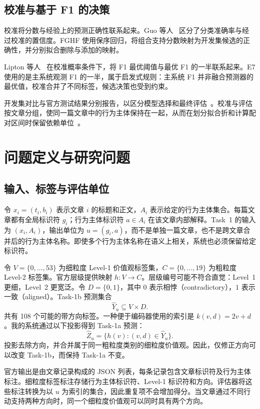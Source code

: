 \documentclass[12pt,a4paper]{article}
\begin{document}
\subsection{校准与基于 F1 的决策}
校准将分数与经验上的预测正确性联系起来。Guo 等人~\cite{guo2017} 区分了分类准确率与经过校准的置信度。FGHF 使用保序回归，将组合支持分数映射为开发集候选的正确性，并分别拟合删除与添加的映射。

Lipton 等人~\cite{lipton2014} 在校准概率条件下，将 F1 最优阈值与最优 F1 的一半联系起来。E7 使用的是主系统观测 F1 的一半，属于启发式规则：主系统 F1 并非融合预测器的最优值，校准合并了不同标签，候选决策也受到约束。

开发集对比与官方测试结果分别报告，以区分模型选择和最终评估~\cite{cawley2010}。校准与评估按文章分组，使同一篇文章中的行为主体保持在一起，从而在划分拟合折和计算配对区间时保留依赖单位~\cite{dror2018}。


\sectionbreak
\section{问题定义与研究问题}\label{sec:problem}
\subsection{输入、标签与评估单位}
令 $x_i=(t_i,b_i)$ 表示文章 $i$ 的标题和正文，$A_i$ 表示给定的行为主体集合。每篇文章都有全局标识符 $g_i$；行为主体标识符 $a\in A_i$ 在该文章内部解释。Task~1 的输入为 $(x_i,A_i)$，输出单位为 $u=(g_i,a)$，而不是单独一篇文章，也不是跨文章合并后的行为主体名称。即使多个行为主体名称在语义上相关，系统也必须保留给定标识符。

令 $V=\{0,\ldots,53\}$ 为细粒度 Level-1 价值观标签集，$C=\{0,\ldots,19\}$ 为粗粒度 Level-2 标签集。官方层级提供映射 $h:V\rightarrow C$。层级编号可能不符合直觉：Level~1 更细，Level~2 更宽泛。令 $D=\{0,1\}$，其中 $0$ 表示相悖（contradictory），$1$ 表示一致（aligned）。Task-1b 预测集合
\begin{equation}
\widehat{Y}_u\subseteq V\times D.
\label{eq:output}
\end{equation}
共有 108 个可能的带方向标签。一种便于编码器使用的索引是 $k(v,d)=2v+d$。我的系统通过以下投影得到 Task-1a 预测：
\begin{equation}
\widehat{Z}_u=\{h(v):(v,d)\in\widehat{Y}_u\}.
\label{eq:projection}
\end{equation}
投影去除方向，并合并属于同一粗粒度类别的细粒度价值观。因此，仅修正方向可以改变 Task-1b，而保持 Task-1a 不变。

官方输出是由文章记录构成的 JSON 列表，每条记录包含文章标识符及行为主体标注。细粒度标签标注存储行为主体标识符、Level-1 标识符和方向。评估器将这些标注转换为以 $u$ 为索引的集合，因此重复项不会增加得分。当文章通过不同行动支持两种方向时，同一个细粒度价值观可以同时具有两个方向。
\end{document}
